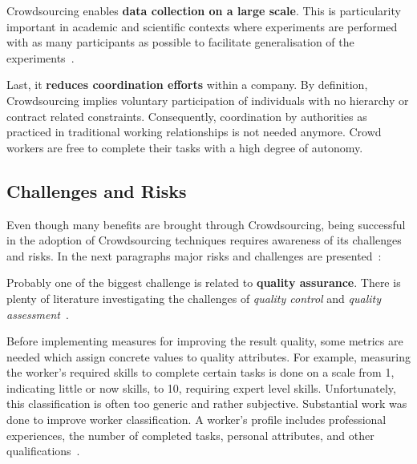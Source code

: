Crowdsourcing enables \textbf{data collection on a large scale}. This is particularity important in academic and scientific contexts where experiments are performed with as many participants as possible to facilitate generalisation of the experiments~\cite{gadiraju2017}. 

Last, it \textbf{reduces coordination efforts} within a company. By definition, Crowdsourcing implies voluntary participation of individuals with no hierarchy or contract related constraints. Consequently, coordination by authorities as practiced in traditional working relationships is not needed anymore. Crowd workers are free to complete their tasks with a high degree of autonomy. 

\subsection{Challenges and Risks}
Even though many benefits are brought through Crowdsourcing, being successful in the adoption of Crowdsourcing techniques requires awareness of its challenges and risks. In the next paragraphs major risks and challenges are presented~\cite{hossfeld2013}:

Probably one of the biggest challenge is related to \textbf{quality assurance}. There is plenty of literature investigating the challenges of \emph{quality control} and \emph{quality assessment}~\cite{allahbakhsh2013, daniel2018, hansen2013, hsueh2009}.

Before implementing measures for improving the result quality, some metrics are needed which assign concrete values to quality attributes. For example, measuring the worker's required skills to complete certain tasks is done on a scale from 1, indicating little or now skills, to 10, requiring expert level skills. Unfortunately, this classification is often too generic and rather subjective. Substantial work was done to improve worker classification. A worker's profile includes professional experiences, the number of completed tasks, personal attributes, and other qualifications~\cite{daniel2018}. 

